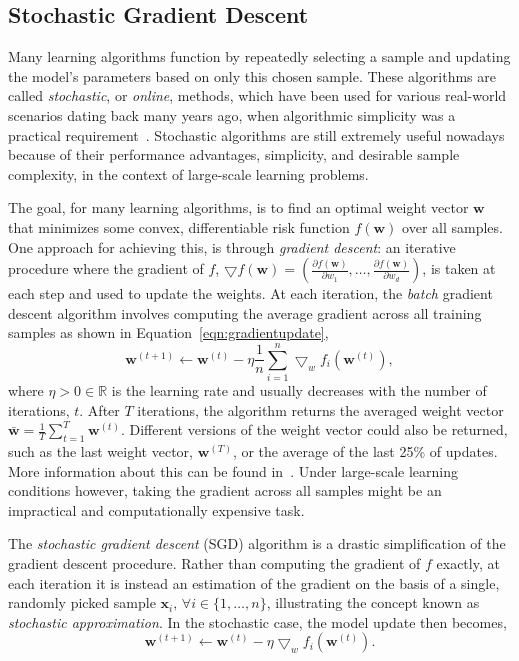 \documentclass[reqno]{vcuthesis}
\newcommand{\reals}{{\mathbb{R}}}
\numberwithin{equation}{chapter}
\begin{document}
\subsection{Stochastic Gradient Descent}
Many learning algorithms function by repeatedly selecting a sample and updating the model's parameters based on only this chosen sample. These algorithms are called \textit{stochastic}, or \textit{online}, methods, which have been used for various real-world scenarios dating back many years ago, when algorithmic simplicity was a practical requirement~\cite{bottou2002stochastic,robbins1951textordfemininea,widrow1960adaptive}. Stochastic algorithms are still extremely useful nowadays because of their performance advantages, simplicity, and desirable sample complexity, in the context of large-scale learning problems. %

The goal, for many learning algorithms, is to find an optimal weight vector $\bm w$ that minimizes some convex, differentiable risk function $f(\bm{w})$ over all samples. One approach for achieving this, is through \textit{gradient descent}: an iterative procedure where the gradient of $f$, $\bigtriangledown f(\bm{w}) = \left(\frac{\partial f(\bm{w})}{\partial w_1}, \ldots, \frac{\partial f(\bm{w})}{\partial w_d}\right)$, is taken at each step and used to update the weights. At each iteration, the \textit{batch} gradient descent algorithm involves computing the average gradient across all training samples as shown in Equation~\ref{eqn:gradientupdate},
\begin{equation}
\bm{w}^{(t+1)} \leftarrow \bm{w}^{(t)} - \eta \frac{1}{n} \sum_{i=1}^n\bigtriangledown_w f_i(\bm{w}^{(t)}),
\label{eqn:gradientupdate}
\end{equation}
where $\eta > 0 \in \reals$ is the learning rate and usually decreases with the number of iterations, $t$. After $T$ iterations, the algorithm returns the averaged weight vector $\bm{\bar{w}} = \frac{1}{T}\sum_{t=1}^T \bm{w}^{(t)}$. Different versions of the weight vector could also be returned, such as the last weight vector, $\bm w^{(T)}$, or the average of the last 25\% of updates. More information about this can be found in~\cite{Melki2016}. Under large-scale learning conditions however, taking the gradient across all samples might be an impractical and computationally expensive task.

The \textit{stochastic gradient descent} (SGD) algorithm is a drastic simplification of the gradient descent procedure. Rather than computing the gradient of $f$ exactly, at each iteration it is instead an estimation of the gradient on the basis of a single, randomly picked sample $\bm x_i,\, \forall i \in \{1, \ldots, n\}$, illustrating the concept known as \textit{stochastic approximation}. In the stochastic case, the model update then becomes,
\begin{equation}
\bm{w}^{(t+1)} \leftarrow \bm{w}^{(t)} - \eta\bigtriangledown_w f_i(\bm{w}^{(t)}).
\label{eqn:gradientupdateo}
\end{equation}
\end{document}
